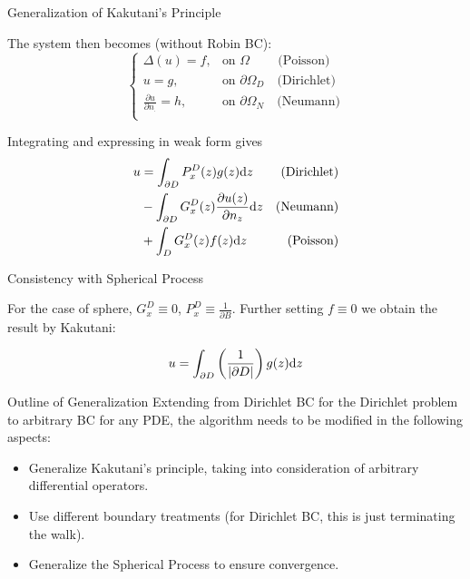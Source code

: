 \documentclass{beamer}
\begin{document}
\begin{frame}{Generalization of Kakutani's Principle}

	The system then becomes (without Robin BC):
	\[
		\begin{cases}
			\Delta(u) = f, & \text{on $\Omega$} \quad \quad\  \text{(Poisson)} \\
			u = g, & \text{on $\partial \Omega_D$} \quad \text{(Dirichlet)} \\
			\frac{\partial u}{\partial n_{\cdot}} = h, & \text{on $\partial \Omega_N$} \quad \text{(Neumann)} \\
		\end{cases}
	\]

	Integrating and expressing in weak form gives
	\begin{align*}
		u & = \int_{\partial D} P_x^D(z) g(z) \mathrm{d} z & \text{(Dirichlet)}\\
		  & - \int_{\partial D} G_x^D(z) \frac{\partial u(z)}{\partial n_{z}} \mathrm{d} z & \text{(Neumann)} \\
		  & + \int_{D} G_x^D(z) f(z) \mathrm{d} z & \text{(Poisson)}
	\end{align*}

\end{frame}

\begin{frame}{Consistency with Spherical Process}

	For the case of sphere, $G_x^D \equiv 0$, $P_x^D \equiv \frac{1}{\partial B}$. Further setting $f \equiv 0$ we obtain the result by Kakutani:

	\[
		u = \int_{\partial D} \left( \frac{1}{\left| \partial D \right|} \right) g(z) \mathrm{d} z
	\]

\end{frame}

\begin{frame}{Outline of Generalization}
	Extending from Dirichlet BC for the Dirichlet problem to arbitrary BC for any PDE, the algorithm needs to be modified in the following aspects:
	\begin{itemize}
		\item Generalize Kakutani's principle, taking into consideration of arbitrary differential operators.
		\item Use different boundary treatments (for Dirichlet BC, this is just terminating the walk).
		\item Generalize the Spherical Process to ensure convergence.
	\end{itemize}
\end{frame}
\end{document}

